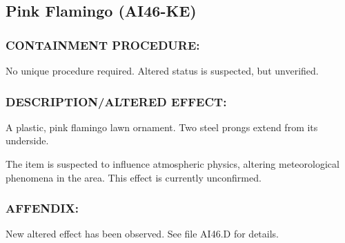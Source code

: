 \subsection*{Pink Flamingo (AI46-KE)}
\subsubsection*{CONTAINMENT PROCEDURE:}
\par No unique procedure required. Altered
status is suspected, but unverified.
\subsubsection*{DESCRIPTION/ALTERED EFFECT:}
\par A plastic, pink flamingo lawn ornament.
Two steel prongs extend from its
underside.
\par The item is suspected to influence atmospheric physics, altering
meteorological phenomena in the area. This effect is currently
unconfirmed.
\subsubsection*{AFFENDIX:}
\par New altered effect has been observed. See file AI46.D for details.